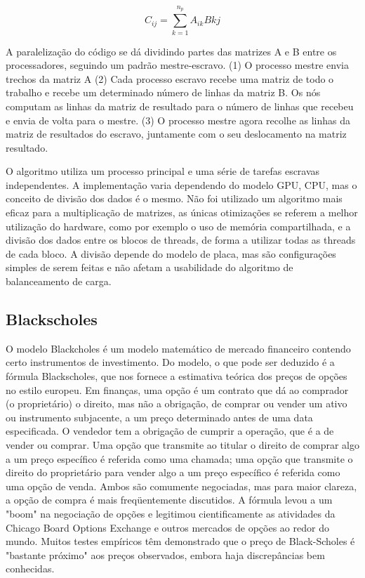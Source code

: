 \begin{equation} C_{ij} = \sum_{k=1}^{n_p} A_{ik}B{kj}
 \label{eq:black}
\end{equation}

A paralelização do código se dá dividindo partes das matrizes A e B entre os processadores, seguindo um padrão mestre-escravo. (1) O processo mestre envia trechos da matriz A
(2) Cada processo escravo recebe uma matriz de todo o trabalho e recebe um determinado número de linhas da matriz B. Os nós computam as linhas da matriz de resultado para o número de linhas que recebeu e envia de volta para o mestre. 
(3) O processo mestre agora recolhe as linhas da matriz de resultados do escravo, juntamente com o seu deslocamento na matriz resultado. 

O algoritmo utiliza um processo principal e uma série de tarefas escravas independentes. A implementação varia dependendo do modelo GPU, CPU, mas o conceito de divisão dos dados é o mesmo. Não foi utilizado um algoritmo mais eficaz para a multiplicação de matrizes, as únicas otimizações se referem a melhor utilização do hardware, como por exemplo o uso de memória compartilhada, e a divisão dos dados entre os blocos de threads, de forma a utilizar todas as threads de cada bloco. A divisão depende do modelo de placa, mas são configurações simples de serem feitas e não afetam a usabilidade do algoritmo de balanceamento de carga. 

\subsection{Blackscholes}

O modelo Blackcholes é um modelo matemático de mercado financeiro contendo certo instrumentos de investimento. Do modelo, o que pode ser deduzido é a fórmula Blackscholes, que nos fornece a estimativa teórica dos preços de opções no estilo europeu. Em finanças, uma opção é um contrato que dá ao comprador (o proprietário) o direito, mas não a obrigação, de comprar ou vender um ativo ou instrumento subjacente, a um preço determinado antes de uma data especificada. O vendedor tem a obrigação de cumprir a operação, que é a de vender ou comprar. Uma opção que transmite ao titular o direito de comprar algo a um preço específico é referida como uma chamada; uma opção que transmite o direito do proprietário para vender algo a um preço específico é referida como uma opção de venda. Ambos são comumente negociadas, mas para maior clareza, a opção de compra é mais freqüentemente discutidos. A fórmula levou a um "boom" na negociação de opções e legitimou cientificamente as atividades da Chicago Board Options Exchange e outros mercados de opções ao redor do mundo. Muitos testes empíricos têm demonstrado que o preço de Black-Scholes é "bastante próximo" aos preços observados, embora haja discrepâncias bem conhecidas. 


